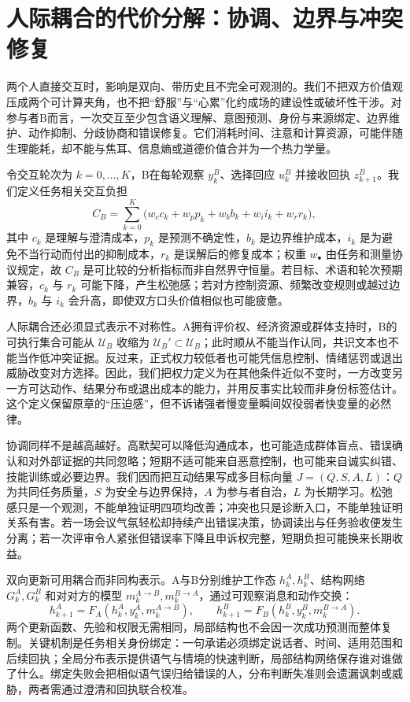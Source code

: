 \section{人际耦合的代价分解：协调、边界与冲突修复}
\label{sec:interpersonal_topology}
两个人直接交互时，影响是双向、带历史且不完全可观测的。我们不把双方价值观压成两个可计算夹角，也不把“舒服”与“心累”化约成场的建设性或破坏性干涉。对参与者B而言，一次交互至少包含语义理解、意图预测、身份与来源绑定、边界维护、动作抑制、分歧协商和错误修复。它们消耗时间、注意和计算资源，可能伴随生理能耗，却不能与焦耳、信息熵或道德价值合并为一个热力学量。

令交互轮次为 $k=0,\ldots,K$，B在每轮观察 $y_k^B$、选择回应 $u_k^B$ 并接收回执 $z_{k+1}^B$。我们定义任务相关交互负担
\[
C_B=\sum_{k=0}^{K}\bigl(w_c c_k+w_p p_k+w_b b_k+w_i i_k+w_r r_k\bigr),
\]
其中 $c_k$ 是理解与澄清成本，$p_k$ 是预测不确定性，$b_k$ 是边界维护成本，$i_k$ 是为避免不当行动而付出的抑制成本，$r_k$ 是误解后的修复成本；权重 $w_\bullet$ 由任务和测量协议规定，故 $C_B$ 是可比较的分析指标而非自然界守恒量。若目标、术语和轮次预期兼容，$c_k$ 与 $r_k$ 可能下降，产生松弛感；若对方控制资源、频繁改变规则或越过边界，$b_k$ 与 $i_k$ 会升高，即使双方口头价值相似也可能疲惫。

人际耦合还必须显式表示不对称性。A拥有评价权、经济资源或群体支持时，B的可执行集合可能从 $\mathcal U_B$ 收缩为 $\mathcal U_B'\subset\mathcal U_B$；此时顺从不能当作认同，共识文本也不能当作低冲突证据。反过来，正式权力较低者也可能凭信息控制、情绪惩罚或退出威胁改变对方选择。因此，我们把权力定义为在其他条件近似不变时，一方改变另一方可达动作、结果分布或退出成本的能力，并用反事实比较而非身份标签估计。这个定义保留原章的“压迫感”，但不诉诸强者慢变量瞬间奴役弱者快变量的必然律。

协调同样不是越高越好。高默契可以降低沟通成本，也可能造成群体盲点、错误确认和对外部证据的共同忽略；短期不适可能来自恶意控制，也可能来自诚实纠错、技能训练或必要边界。我们因而把互动结果写成多目标向量 $J=(Q,S,A,L)$：$Q$ 为共同任务质量，$S$ 为安全与边界保持，$A$ 为参与者自治，$L$ 为长期学习。松弛感只是一个观测，不能单独证明四项均改善；冲突也只是诊断入口，不能单独证明关系有害。若一场会议气氛轻松却持续产出错误决策，协调读出与任务验收便发生分离；若一次评审令人紧张但错误率下降且申诉权完整，短期负担可能换来长期收益。

双向更新可用耦合而非同构表示。A与B分别维护工作态 $h_k^A,h_k^B$、结构网络 $G_k^A,G_k^B$ 和对对方的模型 $m_k^{A\to B},m_k^{B\to A}$，通过可观察消息和动作交换：
\[
h_{k+1}^A=F_A(h_k^A,y_k^A,m_k^{A\to B}),\qquad
h_{k+1}^B=F_B(h_k^B,y_k^B,m_k^{B\to A}).
\]
两个更新函数、先验和权限无需相同，局部结构也不会因一次成功预测而整体复制。关键机制是任务相关身份绑定：一句承诺必须绑定说话者、时间、适用范围和后续回执；全局分布表示提供语气与情境的快速判断，局部结构网络保存谁对谁做了什么。绑定失败会把相似语气误归给错误的人，分布判断失准则会遗漏讽刺或威胁，两者需通过澄清和回执联合校准。

